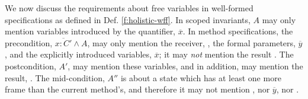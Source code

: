 We now discuss the requirements about free variables in well-formed specifications as defined in Def. \ref{f:holistic-wff}.
 In scoped invariants, $A$ may only mention   variables introduced by the quantifier, $\overline x$. In method specifications, the precondition, $\overline{x:C'} \wedge A$, may only mention the receiver, , the formal parameters, $\overline y$, and the explicitly introduced  variables, $\overline x$; it may \emph{not}  mention the result  . The postcondition, $A'$, may mention these variables, and in addition, may mention the result, . The mid-condition, $A''$ is about a state which has at least one more frame than the current method's,
and therefore it  may not mention , nor $\overline{y}$, nor .



 
